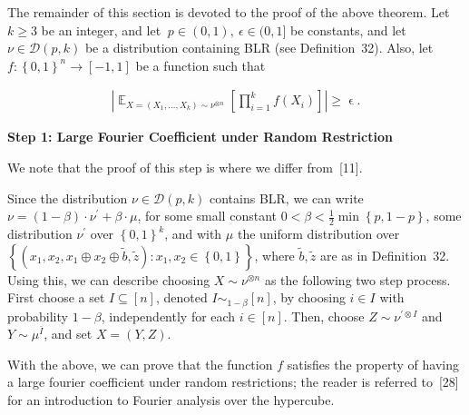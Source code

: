 


The remainder of this section is devoted to the proof of the above theorem.
Let $k\geqslant 3$ be an integer, and let $\ p\in(0,1),\ \epsilon\in(0,1]$ be constants, and let $\nu\in\mathcal{D}(p,k)$ be a distribution containing BLR (see Definition 32).
Also, let $f:\left\{0,1\right\}^{n}\to[-1,1]$ be a function such that\par


\[\begin{gathered}
\left|\mathop{\mathbb{E}}_{X=(X_{1},\dots,X_{k})\sim\nu^{\otimes n}}\left[\prod_{i=1}^{k}f(X_{i})\right]\right|\geqslant\mathop{\epsilon}.
\end{gathered}\]




\par\medskip\noindent\textbf{Step 1: Large Fourier Coefficient under Random Restriction}\par




We note that the proof of this step is where we differ from [11].\par




Since the distribution $\nu\in\mathcal{D}(p,k)$ contains BLR, we can write $\nu=(1-\beta)\cdot\nu^{\prime}+\beta\cdot\mu$, for some small constant $0<\beta<\frac{1}{2}\min\left\{p,1-p\right\}$, some distribution $\nu^{\prime}$ over $\left\{0,1\right\}^{k}$, and with $\mu$ the uniform distribution over $\left\{(x_{1},x_{2},x_{1}\oplus x_{2}\oplus\tilde{b},\tilde{z}):x_{1},x_{2}\in\left\{0,1\right\}\right\}$, where $\tilde{b},\tilde{z}$ are as in Definition 32.
Using this, we can describe choosing $X\sim\nu^{\otimes n}$ as the following two step process. First choose a set $I\subseteq[n]$, denoted $I\sim_{1-\beta}[n]$, by choosing $i\in I$ with probability $1-\beta$, independently for each $i\in[n]$.
Then, choose $Z\sim\nu^{\prime\otimes I}$ and $Y\sim\mu^{\bar{I}}$, and set $X=(Y,Z)$.\par




With the above, we can prove that the function $f$ satisfies the property of having a large fourier coefficient under random restrictions; the reader is referred to [28] for an introduction to Fourier analysis over the hypercube.\par





